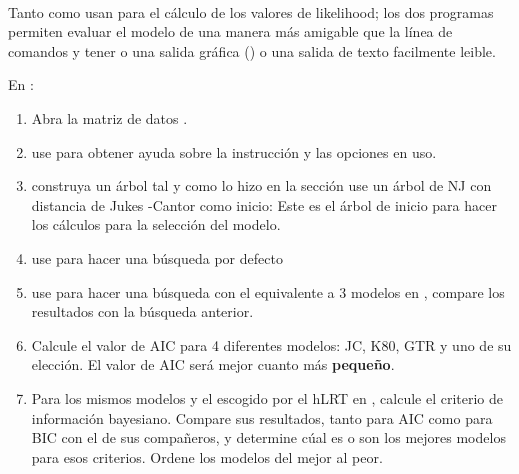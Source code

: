 \\
Tanto  como  usan  para el c\'alculo de los valores de likelihood; los dos programas permiten evaluar el modelo de una manera m\'as amigable que la l\'inea de comandos y tener o una salida gr\'afica () o una salida de texto facilmente leible.




En :

\begin{enumerate}		
	\item Abra la matriz de datos .
	\item use  para obtener ayuda sobre la instrucci\'on  y las opciones en uso.
	\item  construya un \'arbol tal y como lo hizo en la secci\'on %
	use un \'arbol de NJ con distancia de Jukes -Cantor como inicio:
	   Este es el \'arbol de inicio para hacer los c\'alculos para la selecci\'on del modelo.
	    
	\item use 
	   para hacer una b\'usqueda por defecto
	\item use 
	   para hacer una b\'usqueda con el equivalente a 3 modelos en , compare los resultados con la b\'usqueda anterior.

	  
	\item Calcule el valor de AIC para 4 diferentes modelos: JC, K80, GTR y uno de su elecci\'on. El valor de AIC ser\'a mejor cuanto m\'as \textbf{peque\~no}.

	\item Para los mismos modelos y el escogido por el hLRT en , calcule el criterio de informaci\'on bayesiano. Compare sus resultados, tanto para AIC como para BIC con el de sus compa\~neros, y determine c\'ual es o son los mejores modelos para esos criterios. Ordene los modelos del mejor al peor. 


\end{enumerate}





